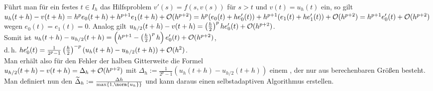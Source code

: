 \begin{Bem}
    Führt man für ein festes $t \in I_h$ das Hilfsproblem
    $v'(s) = f(s, v(s))$ für $s > t$ und $v(t) = u_h(t)$ ein,
    so gilt $u_h(t + h) - v(t + h) =
    h^p e_0(t + h) + h^{p+1} e_1(t + h) + \mathcal{O}(h^{p+2}) =
    h^p (e_0(t) + h e_0'(t)) + h^{p+1} (e_1(t) + h e_1'(t)) + \mathcal{O}(h^{p+2}) =
    h^{p+1} e_0'(t) + \mathcal{O}(h^{p+2})$ wegen
    $e_0(t) = e_1(t) = 0$.
    Analog gilt $u_{h/2}(t + h) - v(t + h) =
    \left(\frac{h}{2}\right)^p h e_0'(t) + \mathcal{O}(h^{p+2})$.\\
    Somit ist $u_h(t + h) - u_{h/2}(t + h) =
    \left(h^{p+1} - \left(\frac{h}{2}\right)^p h\right) e_0'(t) +
    \mathcal{O}(h^{p+2})$,\\
    d.\,h. $h e_0'(t) = \frac{1}{2^p - 1} \left(\frac{h}{2}\right)^{-p}
    (u_h(t + h) - u_{h/2}(t + h)) + \mathcal{O}(h^2)$.\\
    Man erhält also für den Fehler der halben Gitterweite die Formel\\
    $u_{h/2}(t + h) - v(t + h) = \Delta_h + \mathcal{O}(h^{p+2})$ mit
    $\Delta_h := \frac{1}{2^p - 1} (u_h(t + h) - u_{h/2}(t + h))$
    einem , der nur aus berechenbaren Größen besteht.
    Man definiert nun den 
    $\widetilde{\Delta}_h := \frac{\Delta h}{\max\{1, \norm{u_h}\}}$
    und kann daraus einen selbstadaptiven Algorithmus erstellen.
\end{Bem}

\linie

